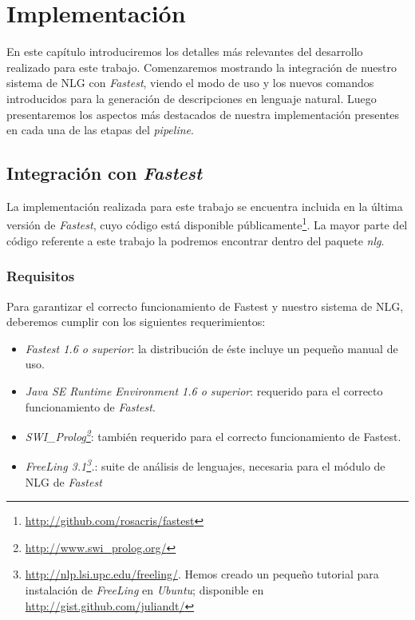\chapter{Implementación}
\label{cap:implementacion}

En este capítulo introduciremos los detalles más relevantes del desarrollo realizado para este trabajo. Comenzaremos mostrando la integración de nuestro sistema de NLG con \textit{Fastest}, viendo el modo de uso y los nuevos comandos introducidos para la generación de descripciones en lenguaje natural. Luego presentaremos los aspectos más destacados de nuestra implementación presentes en cada una de las etapas del \emph{pipeline}.

\section{Integración con \emph{Fastest}}

La implementación realizada para este trabajo se encuentra incluida en la última versión de \emph{Fastest}, cuyo código está disponible públicamente\footnote{\url{http://github.com/rosacris/fastest}}. La mayor parte del código referente a este trabajo la podremos encontrar dentro del paquete \textit{nlg}.

\subsection*{Requisitos}

Para garantizar el correcto funcionamiento de Fastest y nuestro sistema de NLG, deberemos cumplir con los siguientes requerimientos:

\begin{itemize}
 \item  \emph{Fastest 1.6 o superior}: la distribución de éste incluye un pequeño manual de uso.
 \item  \emph{Java SE Runtime Environment 1.6 o superior}: requerido para el correcto funcionamiento de \emph{Fastest}.
 \item  \emph{SWI\_Prolog\footnote{\url{http://www.swi\_prolog.org/}}}: también requerido para el correcto funcionamiento de Fastest.
 \item  \emph{FreeLing 3.1\footnote{\url{http://nlp.lsi.upc.edu/freeling/}. Hemos creado un pequeño tutorial para instalación de \emph{FreeLing} en \emph{Ubuntu}; disponible en \url{http://gist.github.com/juliandt/}}.}: suite de análisis de lenguajes, necesaria para el módulo de NLG de \emph{Fastest}
\end{itemize}

